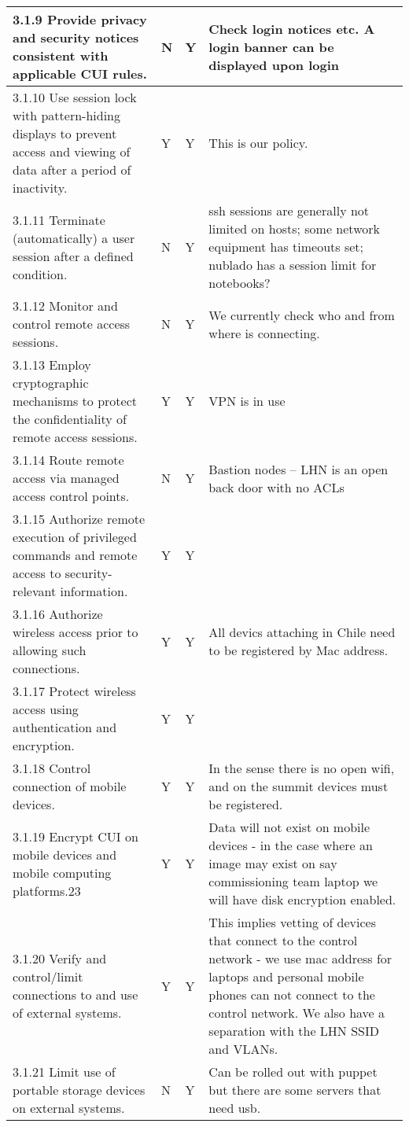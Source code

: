 \begin{longtable} {|p{}|p{}|p{}|p{} |}
{3.1.9 Provide privacy and security notices consistent with applicable CUI rules.}&{N}&{Y}&{Check login notices etc. A login banner can be displayed upon login } \\ \hline
{3.1.10 Use session lock with pattern-hiding displays to prevent access and viewing of data after a period of inactivity.}&{Y}&{Y}&{This is our policy.} \\ \hline
{3.1.11 Terminate (automatically) a user session after a defined condition.}&{N}&{Y}&{ssh sessions are generally not limited on hosts; some network equipment has timeouts set; nublado has a session limit for notebooks?} \\ \hline
{3.1.12 Monitor and control remote access sessions.}&{N}&{Y}&{We currently check who and from where is connecting.} \\ \hline
{3.1.13 Employ cryptographic mechanisms to protect the confidentiality of remote access sessions.}&{Y}&{Y}&{VPN is in use} \\ \hline
{3.1.14 Route remote access via managed access control points.}&{N}&{Y}&{Bastion nodes -- LHN is an open back door with no ACLs} \\ \hline
{3.1.15 Authorize remote execution of privileged commands and remote access to security-relevant information.}&{Y}&{Y}& \\ \hline
{3.1.16 Authorize wireless access prior to allowing such connections.}&{Y}&{Y}&{All devics attaching in Chile need to be registered by Mac address.} \\ \hline
{3.1.17 Protect wireless access using authentication and encryption.}&{Y}&{Y}& \\ \hline
{3.1.18 Control connection of mobile devices.}&{Y}&{Y}&{In the sense there is no open wifi, and on the summit devices must be registered. } \\ \hline
{3.1.19 Encrypt CUI on mobile devices and mobile computing platforms.23}&{Y}&{Y}&{Data will not exist on mobile devices - in the case where an image may exist on say commissioning team laptop we will have disk encryption enabled. } \\ \hline
{3.1.20 Verify and control/limit connections to and use of external systems.}&{Y}&{Y}&{This implies vetting of devices that connect to the control network - we use mac address for laptops and personal mobile phones can not connect to the control network. We also have a separation with the \gls{LHN} \gls{SSID} and \gls{VLAN}s.} \\ \hline
{3.1.21 Limit use of portable storage devices on external systems.}&{N}&{Y}&{Can be rolled out with puppet but there are some servers that need usb. } \\ \hline

\end{longtable}
